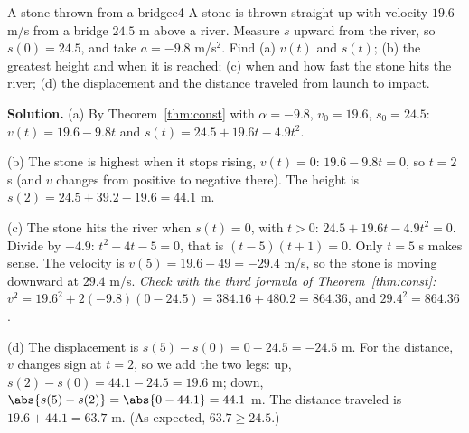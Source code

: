 \documentclass[11pt]{article}
\begin{document}
\begin{exmp}{A stone thrown from a bridge}{e4}
A stone is thrown straight up with velocity $19.6$ m/s from a bridge $24.5$ m above a river. Measure $s$ upward from the river, so $s(0)=24.5$, and take $a=-9.8$ m/s$^2$. Find (a) $v(t)$ and $s(t)$; (b) the greatest height and when it is reached; (c) when and how fast the stone hits the river; (d) the displacement and the distance traveled from launch to impact.

\textbf{Solution.} (a) By Theorem~\ref{thm:const} with $\alpha=-9.8$, $v_0=19.6$, $s_0=24.5$: $v(t)=19.6-9.8t$ and $s(t)=24.5+19.6t-4.9t^2$.

(b) The stone is highest when it stops rising, $v(t)=0$: $19.6-9.8t=0$, so $t=2$ s (and $v$ changes from positive to negative there). The height is $s(2)=24.5+39.2-19.6=44.1$ m.

(c) The stone hits the river when $s(t)=0$, with $t>0$: $24.5+19.6t-4.9t^2=0$. Divide by $-4.9$: $t^2-4t-5=0$, that is $(t-5)(t+1)=0$. Only $t=5$ s makes sense. The velocity is $v(5)=19.6-49=-29.4$ m/s, so the stone is moving downward at $29.4$ m/s.
\emph{Check with the third formula of Theorem~\ref{thm:const}:} $v^2=19.6^2+2(-9.8)(0-24.5)=384.16+480.2=864.36$, and $29.4^2=864.36$. \checkmark

(d) The displacement is $s(5)-s(0)=0-24.5=-24.5$ m. For the distance, $v$ changes sign at $t=2$, so we add the two legs: up, $s(2)-s(0)=44.1-24.5=19.6$ m; down, $\abs{s(5)-s(2)}=\abs{0-44.1}=44.1$ m. The distance traveled is $19.6+44.1=63.7$ m. (As expected, $63.7\ge24.5$.)


\end{exmp}
\end{document}
